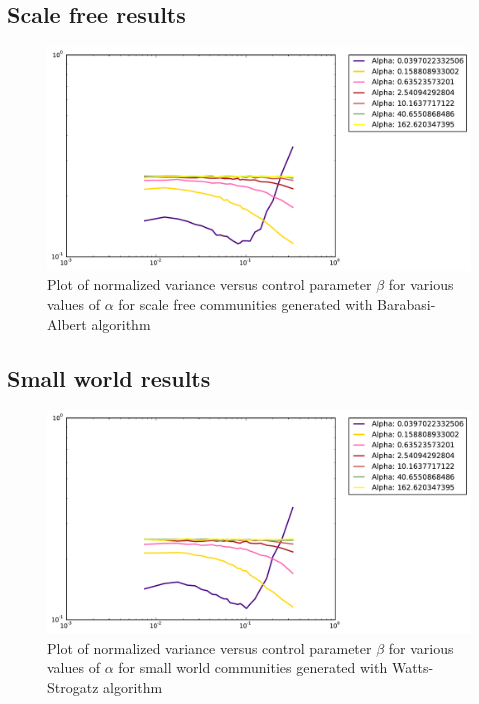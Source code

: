 \subsection{Scale free results}

\begin{figure}[h]
\begin{center}
\includegraphics[scale=0.4]{images/results/vicinity_Barabasi_n403_rounds10000_partial.pdf}
\caption{Plot of normalized variance versus control parameter $\beta$ for various values of $\alpha$  for scale free communities generated with Barabasi-Albert algorithm}
\label{fig:scale free vicinity partial}
\end{center}
\end{figure}

\subsection{Small world results}

\begin{figure}[h]
\begin{center}
\includegraphics[scale=0.4]{images/results/vicinity_WattsStrogatz_n403_rounds10000_partial.pdf}
\caption{Plot of normalized variance versus control parameter $\beta$ for various values of $\alpha$  for small world communities generated with Watts-Strogatz algorithm}
\label{fig:scale free vicinity partial}
\end{center}
\end{figure}

